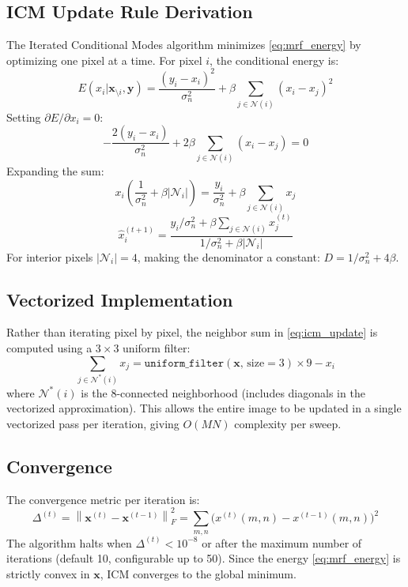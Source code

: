 \documentclass[10pt,conference]{IEEEtran}
\begin{document}
\subsection{ICM Update Rule Derivation}
The Iterated Conditional Modes algorithm minimizes \eqref{eq:mrf_energy} by optimizing one pixel at a time. For pixel $i$, the conditional energy is:
\begin{equation}
E(x_i | \mathbf{x}_{\setminus i}, \mathbf{y}) = \frac{(y_i-x_i)^2}{\sigma_n^2} + \beta\sum_{j\in\mathcal{N}(i)}(x_i-x_j)^2
\end{equation}
Setting $\partial E / \partial x_i = 0$:
\begin{equation}
-\frac{2(y_i-x_i)}{\sigma_n^2} + 2\beta\sum_{j\in\mathcal{N}(i)}(x_i-x_j) = 0
\end{equation}
Expanding the sum:
\begin{equation}
x_i\!\left(\frac{1}{\sigma_n^2} + \beta|\mathcal{N}_i|\right) = \frac{y_i}{\sigma_n^2} + \beta\sum_{j\in\mathcal{N}(i)} x_j
\end{equation}
\begin{equation}
\boxed{\hat{x}_i^{(t+1)} = \frac{y_i/\sigma_n^2 + \beta\displaystyle\sum_{j\in\mathcal{N}(i)} x_j^{(t)}}{1/\sigma_n^2 + \beta|\mathcal{N}_i|}}
\label{eq:icm_update}
\end{equation}
For interior pixels $|\mathcal{N}_i| = 4$, making the denominator a constant: $D = 1/\sigma_n^2 + 4\beta$.

\subsection{Vectorized Implementation}
Rather than iterating pixel by pixel, the neighbor sum in \eqref{eq:icm_update} is computed using a $3\times3$ uniform filter:
\begin{equation}
\sum_{j\in\mathcal{N}^*(i)} x_j = \texttt{uniform\_filter}(\mathbf{x},\,\text{size}=3) \times 9 - x_i
\end{equation}
where $\mathcal{N}^*(i)$ is the 8-connected neighborhood (includes diagonals in the vectorized approximation). This allows the entire image to be updated in a single vectorized pass per iteration, giving $O(MN)$ complexity per sweep.

\subsection{Convergence}
The convergence metric per iteration is:
\begin{equation}
\Delta^{(t)} = \left\|\mathbf{x}^{(t)} - \mathbf{x}^{(t-1)}\right\|_F^2 = \sum_{m,n}\bigl(x^{(t)}(m,n)-x^{(t-1)}(m,n)\bigr)^2
\end{equation}
The algorithm halts when $\Delta^{(t)} < 10^{-8}$ or after the maximum number of iterations (default 10, configurable up to 50). Since the energy \eqref{eq:mrf_energy} is strictly convex in $\mathbf{x}$, ICM converges to the global minimum.
\end{document}
